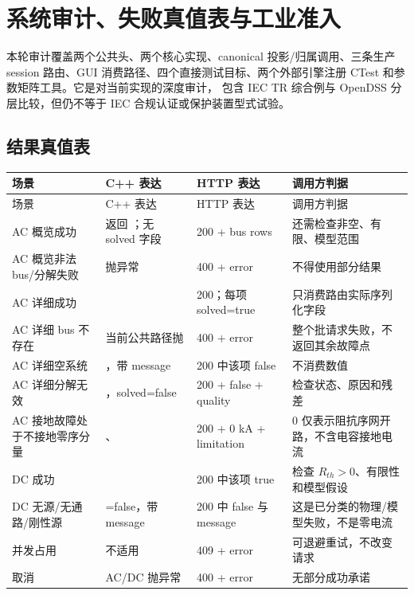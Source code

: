 \section{系统审计、失败真值表与工业准入}\label{sec:sc-audit}

本轮审计覆盖两个公共头、两个核心实现、canonical 投影/归属调用、三条生产 session 路由、GUI
消费路径、四个直接测试目标、两个外部引擎注册 CTest 和参数矩阵工具。它是对当前实现的深度审计，
包含 IEC TR 综合例与 OpenDSS 分层比较，但仍不等于 IEC 合规认证或保护装置型式试验。

\subsection{结果真值表}

\begin{center}\footnotesize
\begin{longtable}{@{}L{3.2cm}L{3.0cm}L{3.0cm}L{4.7cm}@{}}
\toprule
场景 & C++ 表达 & HTTP 表达 & 调用方判据\\
\midrule
\endfirsthead
\toprule
场景 & C++ 表达 & HTTP 表达 & 调用方判据\\
\midrule
\endhead
AC 概览成功 & 返回 ；无 solved 字段 & 200 + bus rows & 还需检查非空、有限、模型范围\\
AC 概览非法 bus/分解失败 & 抛异常 & 400 + error & 不得使用部分结果\\
AC 详细成功 &  & 200；每项 solved=true & 只消费路由实际序列化字段\\
AC 详细 bus 不存在 & 当前公共路径抛  & 400 + error & 整个批请求失败，不返回其余故障点\\
AC 详细空系统 & ，带 message & 200 中该项 false & 不消费数值\\
AC 详细分解无效 & ，solved=false & 200 + false + quality & 检查状态、原因和残差\\
AC 接地故障处于不接地零序分量 & 、 & 200 + 0 kA + limitation & 0 仅表示阻抗序网开路，不含电容接地电流\\
DC 成功 &  & 200 中该项 true & 检查 $R_{th}>0$、有限性和模型假设\\
DC 无源/无通路/刚性源 & =false，带 message & 200 中 false 与 message & 这是已分类的物理/模型失败，不是零电流\\
并发占用 & 不适用 & 409 + error & 可退避重试，不改变请求\\
取消 & AC/DC 抛异常 & 400 + error & 无部分成功承诺\\
\bottomrule
\end{longtable}
\end{center}

